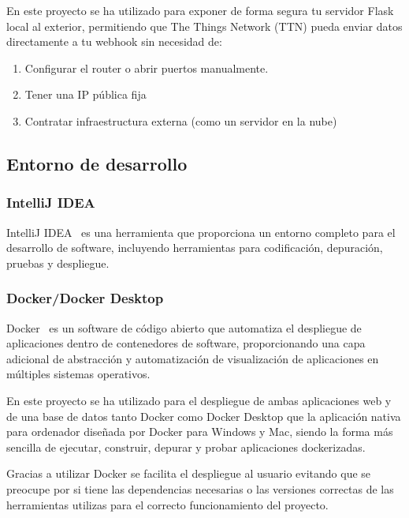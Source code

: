 En este proyecto se ha utilizado para exponer de forma segura tu servidor Flask local al exterior, permitiendo que The Things Network (TTN) pueda enviar datos directamente a tu webhook sin necesidad de:

\begin{enumerate}
    \item Configurar el router o abrir puertos manualmente.
    \item Tener una IP pública fija
    \item Contratar infraestructura externa (como un servidor en la nube)
\end{enumerate}


\subsection{Entorno de desarrollo}

\subsubsection{IntelliJ IDEA}
IntelliJ IDEA~\cite{JB:ITJ} es una herramienta que proporciona un entorno completo para el desarrollo de software, incluyendo herramientas para codificación, depuración, pruebas y despliegue.


\subsubsection{Docker/Docker Desktop}
Docker~\cite{Docker} es un software de código abierto que automatiza el despliegue de aplicaciones dentro de contenedores de software, proporcionando una capa adicional de abstracción y automatización de visualización de aplicaciones en múltiples sistemas operativos.

En este proyecto se ha utilizado para el despliegue de ambas aplicaciones web y de una base de datos tanto Docker como Docker Desktop que la aplicación nativa para ordenador diseñada por Docker para Windows y Mac, siendo la forma más sencilla de ejecutar, construir, depurar y probar aplicaciones dockerizadas. 

Gracias a utilizar Docker se facilita el despliegue al usuario evitando que se preocupe por si tiene las dependencias necesarias o las versiones correctas de las herramientas utilizas para el correcto funcionamiento del proyecto.



